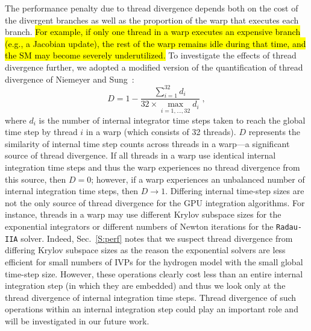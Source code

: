 \documentclass[preprint,review,11pt]{elsarticle}
\DeclareRobustCommand{\hlg}[1]{\sethlcolor{green}\hl{#1}}
\begin{document}
The performance penalty due to thread divergence depends both on the cost of the divergent branches as well as the proportion of the warp that executes each branch.
\hlg{For example, if only one thread in a warp executes an expensive branch (e.g., a Jacobian update), the rest of the warp remains idle during that time, and the SM may become severely underutilized.}
To investigate the effects of thread divergence further, we adopted a modified version of the quantification of thread divergence of Niemeyer and Sung~\cite{Niemeyer:2014aa}:
\begin{equation}
	D = 1 - \frac{\sum_{i=1}^{32}{d_i}}{32 \times \max\limits_{i = 1, \dots, 32} d_i} \;,
	\label{eqn:divergence}
\end{equation}
where $d_i$ is the number of internal integrator time steps taken to reach the global time step by thread $i$ in a warp (which consists of 32 threads).
$D$ represents the similarity of internal time step counts across threads in a warp---a significant source of thread divergence.
If all threads in a warp use identical internal integration time steps and thus the warp experiences no thread divergence from this source, then $D = 0$; however, if a warp experiences an unbalanced number of internal integration time steps, then $D \to 1$.
Differing internal time-step sizes are not the only source of thread divergence for the GPU integration algorithms.
For instance, threads in a warp may use different Krylov subspace sizes for the exponential integrators or different numbers of Newton iterations for the \texttt{Radau-IIA} solver.
Indeed, Sec.~\ref{S:perf} notes that we suspect thread divergence from differing Krylov subspace sizes as the reason the exponential solvers are less efficient for small numbers of IVPs for the hydrogen model with the small global time-step size.
However, these operations clearly cost less than an entire internal integration step (in which they are embedded) and thus we look only at the thread divergence of internal integration time steps.
Thread divergence of such operations within an internal integration step could play an important role and will be investigated in our future work.
\end{document}
